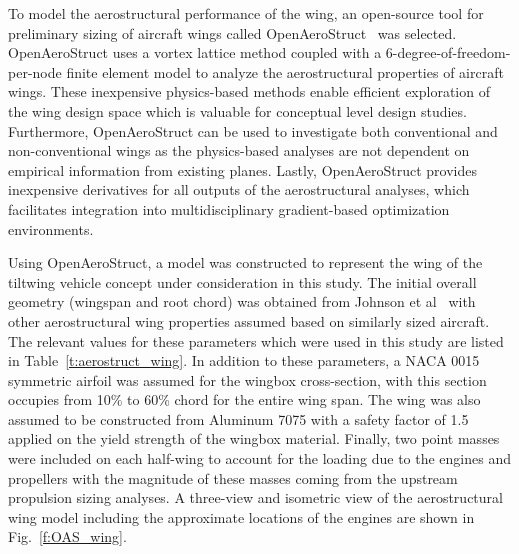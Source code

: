 
To model the aerostructural performance of the wing, an open-source tool for preliminary sizing of aircraft wings called OpenAeroStruct~\cite{Jasa2018a} was selected.
OpenAeroStruct uses a vortex lattice method coupled with a 6-degree-of-freedom-per-node finite element model to analyze the aerostructural properties of aircraft wings.
These inexpensive physics-based methods enable efficient exploration of the wing design space which is valuable for conceptual level design studies.
Furthermore, OpenAeroStruct can be used to investigate both conventional and non-conventional wings as the physics-based analyses are not dependent on empirical information from existing planes.
Lastly, OpenAeroStruct provides inexpensive derivatives for all outputs of the aerostructural analyses, which facilitates integration into multidisciplinary gradient-based optimization environments.

Using OpenAeroStruct, a model was constructed to represent the wing of the tiltwing vehicle concept under consideration in this study.
The initial overall geometry (wingspan and root chord) was obtained from Johnson et al~\cite{johnson2018concept} with other aerostructural wing properties assumed based on similarly sized aircraft.
The relevant values for these parameters which were used in this study are listed in Table~\ref{t:aerostruct_wing}.
In addition to these parameters, a NACA 0015 symmetric airfoil was assumed for the wingbox cross-section, with this section occupies from 10\% to 60\% chord for the entire wing span.
The wing was also assumed to be constructed from Aluminum 7075 with a safety factor of 1.5 applied on the yield strength of the wingbox material.
Finally, two point masses were included on each half-wing to account for the loading due to the engines and propellers with the magnitude of these masses coming from the upstream propulsion sizing analyses.
A three-view and isometric view of the aerostructural wing model including the approximate locations of the engines are shown in Fig.~\ref{f:OAS_wing}.

